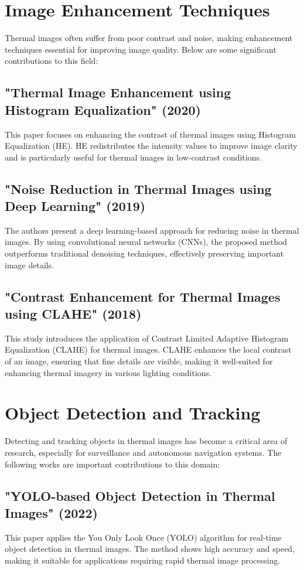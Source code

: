 \documentclass[11pt,a4paper]{report}
\begin{document}
\section{Image Enhancement Techniques}

Thermal images often suffer from poor contrast and noise, making enhancement techniques essential for improving image quality. Below are some significant contributions to this field:

\subsection{"Thermal Image Enhancement using Histogram Equalization" (2020)}
This paper focuses on enhancing the contrast of thermal images using Histogram Equalization (HE). HE redistributes the intensity values to improve image clarity and is particularly useful for thermal images in low-contrast conditions.

\subsection{"Noise Reduction in Thermal Images using Deep Learning" (2019)}
The authors present a deep learning-based approach for reducing noise in thermal images. By using convolutional neural networks (CNNs), the proposed method outperforms traditional denoising techniques, effectively preserving important image details.

\subsection{"Contrast Enhancement for Thermal Images using CLAHE" (2018)}
This study introduces the application of Contrast Limited Adaptive Histogram Equalization (CLAHE) for thermal images. CLAHE enhances the local contrast of an image, ensuring that fine details are visible, making it well-suited for enhancing thermal imagery in various lighting conditions.

\section{Object Detection and Tracking}

Detecting and tracking objects in thermal images has become a critical area of research, especially for surveillance and autonomous navigation systems. The following works are important contributions to this domain:

\subsection{"YOLO-based Object Detection in Thermal Images" (2022)}
This paper applies the You Only Look Once (YOLO) algorithm for real-time object detection in thermal images. The method shows high accuracy and speed, making it suitable for applications requiring rapid thermal image processing.
\end{document}
